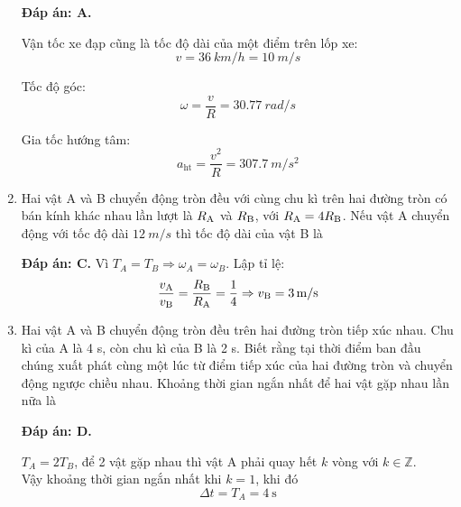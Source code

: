 \begin{enumerate}[label=\bfseries Câu \arabic*:, leftmargin=1.5cm]
	\hideall
	{	
		\textbf{Đáp án: A.}
		
		Vận tốc xe đạp cũng là tốc độ dài của một điểm trên lốp xe:
		$$v=\SI{36}{km/h} = \SI{10}{m/s}$$
		
		Tốc độ góc:
		$$\omega = \dfrac{v}{R} = \SI{30.77}{rad/s}$$
		
		Gia tốc hướng tâm:
		$$a_\text{ht} = \dfrac{v^2}{R} = \SI{307.7}{m/s^2}$$
	}
	\item {}
	
	
	{
		Hai vật A và B chuyển động tròn đều với cùng chu kì trên hai đường tròn có bán kính khác nhau lần lượt là $R_\text A$ và $R_\text B$, với $R_\text A = 4 R_\text B$. Nếu vật A chuyển động với tốc độ dài $\SI{12}{m/s}$ thì tốc độ dài của vật B là
	}
	
	\hideall
	{	
		\textbf{Đáp án: C.}
		Vì $T_A=T_B\Rightarrow\omega_A=\omega_B
$.		
		Lập tỉ lệ:
		$$\dfrac{v_\text A}{v_\text B} = \dfrac{R_\text B}{R_\text A} = \dfrac{1}{4} \Rightarrow v_\text B =\SI{3}{m/s} $$
	}
	\item {}
	
	
	{
		Hai vật A và B chuyển động tròn đều trên hai đường tròn tiếp xúc nhau. Chu kì của A là 4 s, còn chu kì của B là 2 s. Biết rằng tại thời điểm ban đầu chúng xuất phát cùng một lúc từ điểm tiếp xúc của hai đường tròn và chuyển động ngược chiều nhau. Khoảng thời gian ngắn nhất để hai vật gặp nhau lần nữa là
	}
	
	\hideall
	{	
		\textbf{Đáp án: D.}
		
	$T_A=2T_B$, để 2 vật gặp nhau thì vật A phải quay hết $k$ vòng với $k\in\mathbb{Z}$.\\
		
		Vậy khoảng thời gian ngắn nhất khi $k=1$, khi đó $$\Delta t= T_A=\SI{4}{\second}$$
	}
	
\end{enumerate}
